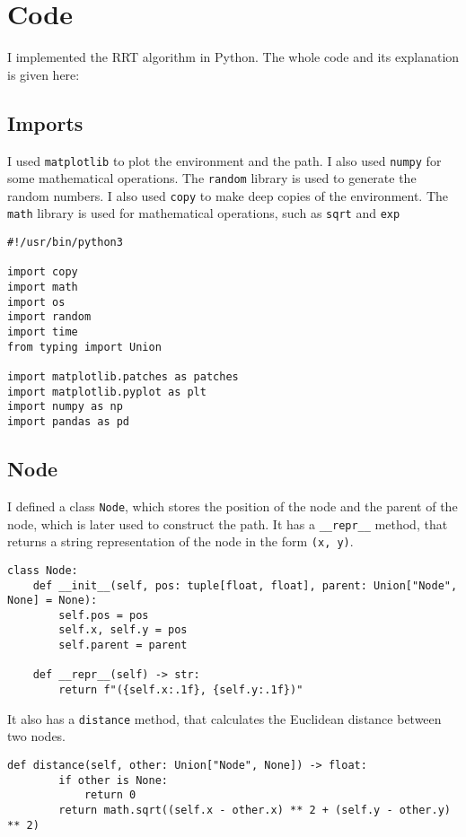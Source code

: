\documentclass[12pt]{report}
\begin{document}
\section{Code}

I implemented the RRT algorithm in Python. The whole code and its explanation is given here:

\subsection{Imports}

I used \texttt{matplotlib} to plot the environment and the path. I also used \texttt{numpy} for some mathematical operations. The \texttt{random} library is used to generate the random numbers. I also used \texttt{copy} to make deep copies of the environment. The \texttt{math} library is used for mathematical operations, such as \texttt{sqrt} and \texttt{exp}

\begin{lstlisting}[caption={Imports}]
#!/usr/bin/python3

import copy
import math
import os
import random
import time
from typing import Union

import matplotlib.patches as patches
import matplotlib.pyplot as plt
import numpy as np
import pandas as pd      
\end{lstlisting}

\subsection{Node}

I defined a class \texttt{Node}, which stores the position of the node and the parent of the node, which is later used to construct the path. It has a \texttt{\_\_repr\_\_} method, that returns a string representation of the node in the form \texttt{(x, y)}.

\begin{lstlisting}[caption={Node Class}]
class Node:
    def __init__(self, pos: tuple[float, float], parent: Union["Node", None] = None):
        self.pos = pos
        self.x, self.y = pos
        self.parent = parent

    def __repr__(self) -> str:
        return f"({self.x:.1f}, {self.y:.1f})"
\end{lstlisting}

It also has a \texttt{distance} method, that calculates the Euclidean distance between two nodes.

\begin{lstlisting}[caption={\texttt{Node.distance}}]
    def distance(self, other: Union["Node", None]) -> float:
        if other is None:
            return 0
        return math.sqrt((self.x - other.x) ** 2 + (self.y - other.y) ** 2)
\end{lstlisting}
\end{document}
